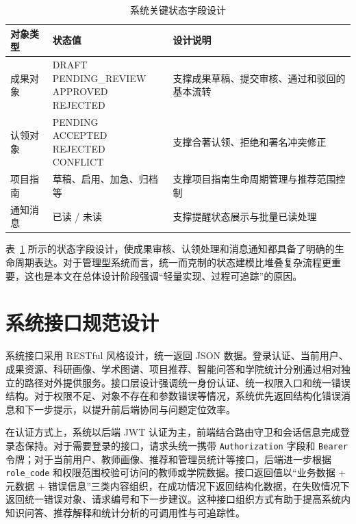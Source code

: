 \documentclass[12pt,a4paper]{ctexbook}
\newcommand{\codecell}[1]{\parbox[t]{\hsize}{\raggedright\scriptsize\ttfamily #1}}
\begin{document}
\begin{table}[H]
  \centering
  \small
  \caption{系统关键状态字段设计}
  \label{tab:status-design}
  \begin{tabular}{p{2.8cm}p{3.3cm}p{5.5cm}}
    \toprule
    对象类型 & 状态值 & 设计说明 \\
    \midrule
    成果对象 & \codecell{DRAFT\\PENDING\_REVIEW\\APPROVED\\REJECTED} & 支撑成果草稿、提交审核、通过和驳回的基本流转 \\
    认领对象 & \codecell{PENDING\\ACCEPTED\\REJECTED\\CONFLICT} & 支撑合著认领、拒绝和署名冲突修正 \\
    项目指南 & 草稿、启用、加急、归档等 & 支撑项目指南生命周期管理与推荐范围控制 \\
    通知消息 & 已读 / 未读 & 支撑提醒状态展示与批量已读处理 \\
    \bottomrule
  \end{tabular}
\end{table}

表~\ref{tab:status-design} 所示的状态字段设计，使成果审核、认领处理和消息通知都具备了明确的生命周期表达。对于管理型系统而言，统一而克制的状态建模比堆叠复杂流程更重要，这也是本文在总体设计阶段强调“轻量实现、过程可追踪”的原因。

\section{系统接口规范设计}
系统接口采用 RESTful 风格设计，统一返回 JSON 数据。登录认证、当前用户、成果资源、科研画像、学术图谱、项目推荐、智能问答和学院统计分别通过相对独立的路径对外提供服务。接口层设计强调统一身份认证、统一权限入口和统一错误结构。对于权限不足、对象不存在和参数错误等情况，系统优先返回结构化错误消息和下一步提示，以提升前后端协同与问题定位效率。

在认证方式上，系统以后端 JWT 认证为主，前端结合路由守卫和会话信息完成登录态保持。对于需要登录的接口，请求头统一携带 \texttt{Authorization} 字段和 \texttt{Bearer} 令牌；对于当前用户、教师画像、推荐和管理员统计等接口，后端进一步根据 \texttt{role\_code} 和权限范围校验可访问的教师或学院数据。接口返回值以“业务数据 + 元数据 + 错误信息”三类内容组织，在成功情况下返回结构化数据，在失败情况下返回统一错误对象、请求编号和下一步建议。这种接口组织方式有助于提高系统内知识问答、推荐解释和统计分析的可调用性与可追踪性\cite{qa_system_survey_2023}\cite{recsys_survey_cn_2022}。
\end{document}
